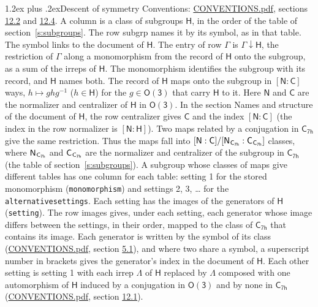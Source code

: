 \documentclass[10pt,a4paper]{article}
\makeatletter
\renewcommand\section{\@startsection{section}{1}{\z@}{-3ex plus -1ex minus -.2ex}%
  {1.2ex plus .2ex}{\normalfont\large\sffamily\bfseries\color{parttitle}}}
\numberwithin{equation}{section}
\newcommand{\grp}[1]{\mathsf{#1}}
\newcommand{\grpindex}[2]{[#1 : #2]}
\newcommand{\restr}[2]{#1\!\downarrow#2}
\newcommand{\hairsp}{\mkern1mu}
\makeatother
\begin{document}
\section{Descent of symmetry}\label{s:subduction}
Conventions: \href{../../CONVENTIONS.pdf}{CONVENTIONS.pdf}, sections \href{../../CONVENTIONS.pdf\#conv.12.2}{12.2} and \href{../../CONVENTIONS.pdf\#conv.12.4}{12.4}.
A column is a class of subgroups $\grp{H}$, in the order of the table of section~\ref{s:subgroups}. The row subgrp names it by its symbol, as in that table. The symbol links to the document of $\grp{H}$. The entry of row $\Gamma$ is $\restr{\Gamma}{\grp{H}}$, the restriction of $\Gamma$ along a monomorphism from the record of $\grp{H}$ onto the subgroup, as a sum of the irreps of $\grp{H}$. The monomorphism identifies the subgroup with its record, and $\grp{H}$ names both. \label{n:group.normalizer.o3}\label{n:group.centralizer.o3}The record of $\grp{H}$ maps onto the subgroup in $\grpindex{\grp{N}}{\grp{C}}$ ways, $h \mapsto g h g^{-1}$ ($h \in \grp{H}$) for the $g \in \grp{O(3)}$ that carry $\grp{H}$ to it. Here $\grp{N}$ and $\grp{C}$ are the normalizer and centralizer of $\grp{H}$ in \href{O3.pdf}{$\grp{O(3)}$}. In the section Names and structure of the document of $\grp{H}$, the row centralizer gives $\grp{C}$ and the index $\grpindex{\grp{N}}{\grp{C}}$ (the index in the row normalizer is $\grpindex{\grp{N}}{\grp{H}}$). Two maps related by a conjugation in $\grp{C_{7h}}$ give the same restriction. Thus the maps fall into $\grpindex{\grp{N}}{\grp{C}}/\grpindex{\grp{N}_{\hairsp \grp{C_{7h}}}}{\grp{C}_{\hairsp \grp{C_{7h}}}}$ classes, where $\grp{N}_{\hairsp \grp{C_{7h}}}$ and $\grp{C}_{\hairsp \grp{C_{7h}}}$ are the normalizer and centralizer of the subgroup in $\grp{C_{7h}}$ (the table of section~\ref{s:subgroups}). \label{n:head.setting}A subgroup whose classes of maps give different tables has one column for each table: setting 1 for the stored monomorphism (\texttt{monomorphism}) and settings 2, 3, \dots{} for the \texttt{alternativesettings}. Each setting has the images of the generators of $\grp{H}$ (\texttt{setting}). \label{n:head.images}The row images gives, under each setting, each generator whose image differs between the settings, in their order, mapped to the class of $\grp{C_{7h}}$ that contains its image. Each generator is written by the symbol of its class (\href{../../CONVENTIONS.pdf}{CONVENTIONS.pdf}, section \href{../../CONVENTIONS.pdf\#conv.5.1}{5.1}), and where two share a symbol, a superscript number in brackets gives the generator's index in the document of $\grp{H}$. \label{n:irrep.Delta}Each other setting is setting 1 with each irrep $\Lambda$ of $\grp{H}$ replaced by $\Lambda$ composed with one automorphism of $\grp{H}$ induced by a conjugation in \href{O3.pdf}{$\grp{O(3)}$} and by none in $\grp{C_{7h}}$ (\href{../../CONVENTIONS.pdf}{CONVENTIONS.pdf}, section \href{../../CONVENTIONS.pdf\#conv.12.1}{12.1}).
\end{document}
